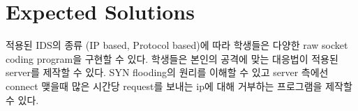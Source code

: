 \documentclass[a4paper, 11pt]{article}
\theoremstyle{definition}
\begin{document}
\section{Expected Solutions}

\begin{solution}
적용된 IDS의 종류 (IP based, Protocol based)에 따라 학생들은 다양한 raw socket coding program을 구현할 수 있다. 학생들은 본인의 공격에 맞는 대응법이 적용된 server를 제작할 수 있다. SYN flooding의 원리를 이해할 수 있고 server 측에선 connect 맺을때 많은 시간당 request를 보내는 ip에 대해 거부하는 프로그램을 제작할 수 있다.
\end{solution}



\end{document}
